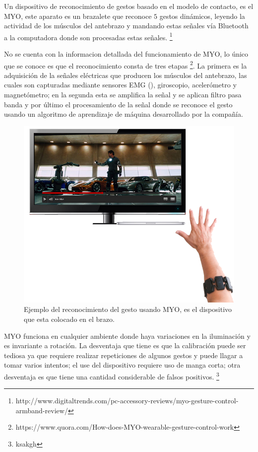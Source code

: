 Un dispositivo de reconocimiento de gestos basado en el modelo de contacto, es el MYO, este aparato es un brazalete que reconoce $5$ gestos dinámicos, leyendo la actividad de los músculos del antebrazo y mandando estas señales vía Bluetooth a la computadora donde son procesadas estas señales. \footnote{http://www.digitaltrends.com/pc-accessory-reviews/myo-gesture-control-armband-review/} 

No se cuenta con la informacion detallada del funcionamiento de MYO, lo único que se conoce es que el reconocimiento consta de tres etapas \footnote{https://www.quora.com/How-does-MYO-wearable-gesture-control-work}. La primera es la adquisición de la señales eléctricas que producen los músculos del antebrazo, las cuales son capturadas mediante sensores EMG (), giroscopio, acelerómetro y magnetómetro; en la segunda esta se amplifica la señal y se aplican filtro pasa banda  y por último el procesamiento de la señal donde se reconoce el gesto usando un algoritmo de aprendizaje de máquina desarrollado por la compañía.  

\begin{figure}[h!]
\begin{center}
\includegraphics[scale=.5]{./Figures/MYO.png}
\end{center}
\caption{Ejemplo del reconocimiento del gesto usando MYO, es el dispositivo que esta colocado en el brazo.}
\label{fig:Myo}
\end{figure}

MYO funciona en cualquier ambiente donde haya variaciones en la iluminación y es invariante a rotación. La desventaja que tiene es que la calibración puede ser tediosa ya que requiere realizar repeticiones de algunos gestos y puede llagar a tomar varios intentos; el use del dispositivo requiere uso de manga corta; otra desventaja es que tiene una cantidad considerable de falsos positivos. \footnote{ksakgh} 


